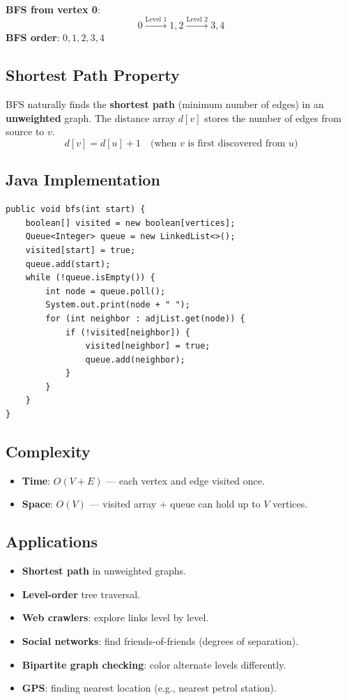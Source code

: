 \documentclass[12pt,a4paper]{article}
\begin{document}
\textbf{BFS from vertex 0}:
\[
0 \xrightarrow{\text{Level 1}} 1, 2 \xrightarrow{\text{Level 2}} 3, 4
\]
\textbf{BFS order}: $0, 1, 2, 3, 4$

\subsection{Shortest Path Property}
BFS naturally finds the \textbf{shortest path} (minimum number of edges) in an \textbf{unweighted} graph. The distance array $d[v]$ stores the number of edges from source to $v$.
\[
d[v] = d[u] + 1 \quad \text{(when } v \text{ is first discovered from } u \text{)}
\]

\subsection{Java Implementation}
\begin{lstlisting}[style=javastyle, caption={BFS — Java}]
public void bfs(int start) {
    boolean[] visited = new boolean[vertices];
    Queue<Integer> queue = new LinkedList<>();
    visited[start] = true;
    queue.add(start);
    while (!queue.isEmpty()) {
        int node = queue.poll();
        System.out.print(node + " ");
        for (int neighbor : adjList.get(node)) {
            if (!visited[neighbor]) {
                visited[neighbor] = true;
                queue.add(neighbor);
            }
        }
    }
}
\end{lstlisting}

\subsection{Complexity}
\begin{itemize}
    \item \textbf{Time}: $O(V + E)$ — each vertex and edge visited once.
    \item \textbf{Space}: $O(V)$ — visited array + queue can hold up to $V$ vertices.
\end{itemize}

\subsection{Applications}
\begin{itemize}
    \item \textbf{Shortest path} in unweighted graphs.
    \item \textbf{Level-order} tree traversal.
    \item \textbf{Web crawlers}: explore links level by level.
    \item \textbf{Social networks}: find friends-of-friends (degrees of separation).
    \item \textbf{Bipartite graph checking}: color alternate levels differently.
    \item \textbf{GPS}: finding nearest location (e.g., nearest petrol station).
\end{itemize}
\end{document}
